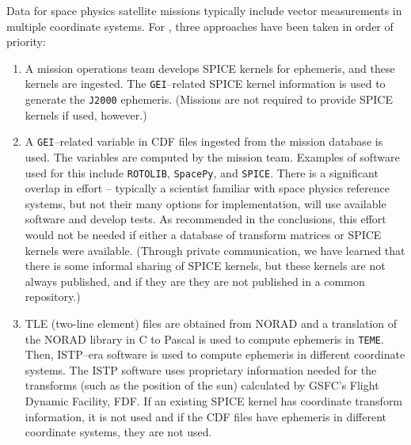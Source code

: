 \documentclass[draft]{agujournal2019}
\begin{document}
Data for space physics satellite missions typically include vector measurements in multiple coordinate systems. For , three approaches have been taken in order of priority:

\begin{enumerate}
    \parskip 0.1in 

    \item A mission operations team develops SPICE kernels for ephemeris, and these kernels are ingested. The \texttt{GEI}--related SPICE kernel information is used to generate the \texttt{J2000} ephemeris.
    (Missions are not required to provide SPICE kernels if used, however.)

    \item A \texttt{GEI}--related variable in CDF files ingested from the mission database is used. The variables are computed by the mission team. Examples of software used for this include \texttt{ROTOLIB}, \texttt{SpacePy}, and \texttt{SPICE}. There is a significant overlap in effort -- typically a scientist familiar with space physics reference systems, but not their many options for implementation, will use available software and develop tests. As recommended in the conclusions, this effort would not be needed if either a database of transform matrices or SPICE kernels were available. (Through private communication, we have learned that there is some informal sharing of SPICE kernels, but these kernels are not always published, and if they are they are not published in a common repository.)

    \item TLE (two-line element) files are obtained from NORAD and a translation of the NORAD library in C to Pascal \cite{NORADSGP4c} is used to compute ephemeris in \texttt{TEME}. Then, ISTP--era software is used to compute ephemeris in different coordinate systems. The ISTP software uses proprietary information needed for the transforms (such as the position of the sun) calculated by GSFC's Flight Dynamic Facility, FDF. If an existing SPICE kernel has coordinate transform information, it is not used and if the CDF files have ephemeris in different coordinate systems, they are not used.
    

\end{enumerate}
\end{document}
